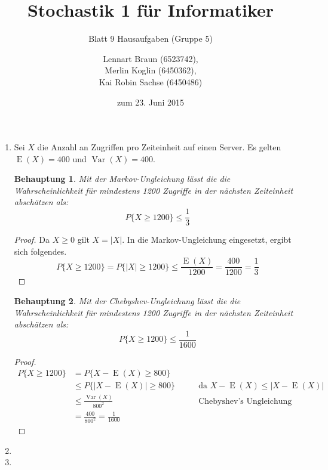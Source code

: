 \documentclass[a4paper]{scrartcl}
\title{Stochastik 1 für Informatiker}
\subtitle{Blatt 9 Hausaufgaben (Gruppe 5)}
\author{
    Lennart Braun (6523742), \\
    Merlin Koglin (6450362), \\
    Kai Robin Sachse (6450486)
}
\date{zum 23. Juni 2015}
\newtheorem*{behaupt}{Behauptung}
\newcommand{\e}{\operatorname{E}}
\newcommand{\var}{\operatorname{Var}}
\begin{document}
\maketitle

\begin{enumerate}[label=\bfseries\arabic*.]
    \item
        Sei $X$ die Anzahl an Zugriffen pro Zeiteinheit auf einen Server.
        Es gelten $\e(X) = 400$ und $\var(X) = 400$.
        \begin{behaupt}
            Mit der Markov-Ungleichung lässt die die Wahrscheinlichkeit für
            mindestens 1200 Zugriffe in der nächsten Zeiteinheit abschätzen als:
            \begin{equation*}
                P\{X \geq 1200\} \leq \frac{1}{3}
            \end{equation*}
        \end{behaupt}
        \begin{proof}
            Da $X \geq 0$ gilt $X = |X|$.
            In die Markov-Ungleichung eingesetzt, ergibt sich folgendes.
            \begin{equation*}
                P\{X \geq 1200\} = P\{|X| \geq 1200\}
                \leq \frac{\e(X)}{1200} = \frac{400}{1200} = \frac{1}{3}
            \end{equation*}
        \end{proof}

        \begin{behaupt}
            Mit der Chebyshev-Ungleichung lässt die die Wahrscheinlichkeit für
            mindestens 1200 Zugriffe in der nächsten Zeiteinheit abschätzen als:
            \begin{equation*}
                P\{X \geq 1200\} \leq \frac{1}{1600}
            \end{equation*}
        \end{behaupt}
        \begin{proof}
            \begin{equation*}
                \begin{alignedat}{2}
                    P\{X \geq 1200\} &= P\{X - \e(X) \geq 800\} \\
                                     &\leq P\{|X - \e(X)| \geq 800\}
                    \qquad &\text{da } X - \e(X) \leq |X - \e(X)| \\
                    &\leq \frac{\var(X)}{800^2}
                    \qquad &\text{Chebyshev's Ungleichung} \\
                    &= \frac{400}{800^2} = \frac{1}{1600}
                \end{alignedat}
            \end{equation*}
        \end{proof}

    \item

    \item

\end{enumerate}
\end{document}
